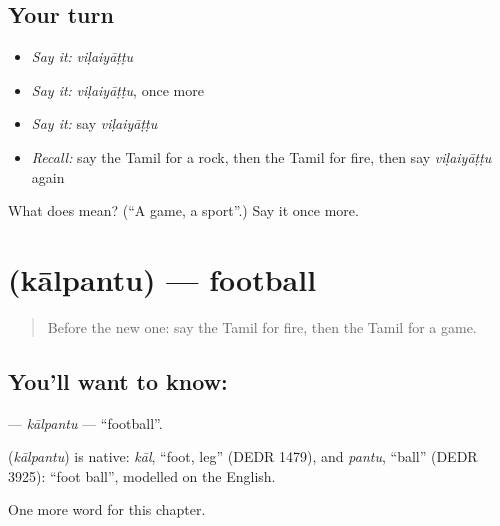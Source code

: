 \subsection*{Your turn}
\begin{itemize}
\raggedright
  \item \emph{Say it:} \emph{viḷaiyāṭṭu}
  \item \emph{Say it:} \emph{viḷaiyāṭṭu}, once more
  \item \emph{Say it:} say \emph{viḷaiyāṭṭu}
  \item \emph{Recall:} say the Tamil for a rock, then the Tamil for fire, then say \emph{viḷaiyāṭṭu} again
\end{itemize}

\begin{tcolorbox}[breakable,colback=teal!4,colframe=teal!35!black,title={Before you move on}]
What does  mean? (\textquotedblleft{}A game, a sport\textquotedblright{}.) Say it once more.
\end{tcolorbox}
\section[\texorpdfstring{\ta{கால்பந்து} (kālpantu)}{கால்பந்து (kālpantu)}]{ (kālpantu) — football}

\label{lesson:TA-C249-kalpantu}



\begin{quote}
Before the new one: say the Tamil for fire, then the Tamil for a game.
\end{quote}

\subsection*{You'll want to know: }
\textbf{} — \emph{kālpantu} — \textquotedblleft{}football\textquotedblright{}.

\begin{cousinweb}
\textbf{} (\emph{kālpantu}) is native: \emph{kāl}, \textquotedblleft{}foot, leg\textquotedblright{} (DEDR 1479), and \emph{pantu}, \textquotedblleft{}ball\textquotedblright{} (DEDR 3925): \textquotedblleft{}foot ball\textquotedblright{}, modelled on the English.
\end{cousinweb}

\begin{grammarlens}[title={What you've built}]
One more word for this chapter.
\end{grammarlens}

